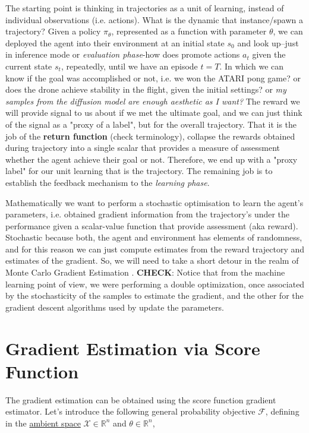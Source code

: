 The starting point is thinking in trajectories as a unit of learning, instead of individual observations (i.e. actions). What is the dynamic that instance/spawn a trajectory? Given a policy $\pi_{\theta}$, represented as a function with parameter $\theta$, we can deployed the agent into their environment at an initial state $s_0$ and look up--just in inference mode or \textit{evaluation phase}-how does promote actions $a_t$ given the current state $s_t$, repeatedly, until we have an episode $t=T$. In which we can know if the goal was accomplished or not, i.e. we won the ATARI pong game? or does the drone achieve stability in the flight, given the initial settings? or \textit{my samples from the diffusion model are enough aesthetic as I want?} The reward we will provide signal to us about if we met the ultimate goal, and we can just think of the signal as a "proxy of a label", but for the overall trajectory. That it is the job of the \textbf{return function} (check terminology), collapse the rewards obtained during trajectory into a single scalar that provides a measure of assessment whether the agent achieve their goal or not. Therefore, we end up with a "proxy label" for our unit learning that is the trajectory. The remaining job is to establish the feedback mechanism to the \textit{learning phase}.

Mathematically we want to perform a stochastic optimisation to learn the agent's parameters, i.e. obtained gradient information from the trajectory's under the performance given a scalar-value function that provide assessment (aka reward). Stochastic because both, the agent and environment has elements of randomness, and for this reason we can just compute estimates from the reward trajectory and estimates of the gradient. So, we will need to take a short detour in the realm of Monte Carlo Gradient Estimation \citep{mohamed2020monte}. \textbf{CHECK}: Notice that from the machine learning point of view, we were performing a double optimization, once associated by the stochasticity of the samples to estimate the gradient, and the other for the gradient descent algorithms used by update the parameters.

\section{Gradient Estimation via Score Function}

The gradient estimation can be obtained using the score function gradient estimator. Let's introduce the following general probability objective $\mathcal{F}$, defining in the \href{https://en.wikipedia.org/wiki/Ambient_space_(mathematics)}{ambient space} $\mathcal{X}\in\mathbb{R}^n$ and $\theta\in\mathbb{R}^n$,

